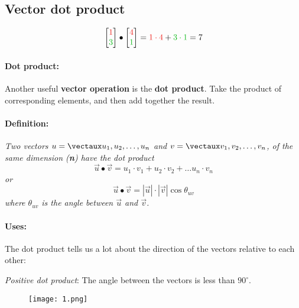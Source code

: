 \documentclass{article}
\begin{document}
\color{white}
\subsection{Vector dot product}
\color{black}

\begin{equation*}
 \icol{\color{rooj} 1 \\ \color{groen} 3 \color{black} } \bullet \icol{\color{rooj} 4 \\ \color{groen} 1 \color{black} } = \color{rooj} 1 \cdot 4  \color{black} + \color{groen}  3 \cdot 1 \color{black} = 7
\end{equation*}





\paragraph{Dot product:} Another useful \textbf{vector operation} is the \textbf{dot product}. Take the product of corresponding elements, and then add together the result. 

\color{theorem} \paragraph{Definition:} \textit{Two vectors $u=\vect{u_1, u_2,\dots,u_n}$ and $v=\vect{v_1,v_2,\dots,v_n}$, of the same dimension (\textbf{n}) have the dot product 
\[
\vec{u}\bullet \vec{v} = u_1\cdot v_1 + u_2\cdot v_2+ \dots u_n\cdot v_n 
\]
or
\[
\vec{u}\bullet \vec{v} = |\vec{u}|\cdot |\vec{v}| \cos \theta_{uv}
\]
where $\theta_{uv}$ is the angle between $\vec{u}$ and $\vec{v}$.
} \color{black}

\paragraph{Uses:} The dot product tells us a lot about the direction of the vectors relative to each other:


\begin{minipage}{0.45\textwidth}
\begin{flushleft}
\textit{Positive dot product}: The angle between the vectors is less than $90^\circ$. 
\end{flushleft}
\end{minipage} \hfill
\begin{minipage}{0.45\textwidth}
\begin{figure}[H]
\texttt{[image: 1.png]}
\end{figure}
\end{minipage}
\end{document}
